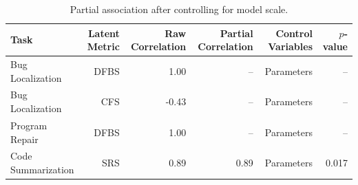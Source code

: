 \begin{table}[t]
\centering
\caption{Partial association after controlling for model scale.}
\label{tab:partial}
\begin{tabular}{lrrrrr}
\toprule
Task & Latent Metric & Raw Correlation & Partial Correlation & Control Variables & $p$-value \\
\midrule
Bug Localization & DFBS & 1.00 & -- & Parameters & -- \\
Bug Localization & CFS & -0.43 & -- & Parameters & -- \\
Program Repair & DFBS & 1.00 & -- & Parameters & -- \\
Code Summarization & SRS & 0.89 & 0.89 & Parameters & 0.017 \\
\bottomrule
\end{tabular}
\end{table}
